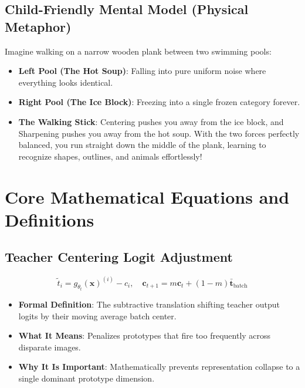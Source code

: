 \documentclass[11pt,a4paper]{article}
\theoremstyle{definition}
\begin{document}
\subsection{Child-Friendly Mental Model (Physical Metaphor)}
Imagine walking on a narrow wooden plank between two swimming pools:
\begin{itemize}
    \item \textbf{Left Pool (The Hot Soup)}: Falling into pure uniform noise where everything looks identical.
    \item \textbf{Right Pool (The Ice Block)}: Freezing into a single frozen category forever.
    \item \textbf{The Walking Stick}: Centering pushes you away from the ice block, and Sharpening pushes you away from the hot soup. With the two forces perfectly balanced, you run straight down the middle of the plank, learning to recognize shapes, outlines, and animals effortlessly!
\end{itemize}

\section{Core Mathematical Equations and Definitions}

\subsection{Teacher Centering Logit Adjustment}
{\boldmath
\begin{equation}
\tilde{t}_i = g_{\theta_t}(\mathbf{x})^{(i)} - c_i, \quad \mathbf{c}_{t+1} = m \mathbf{c}_t + (1 - m) \bar{\mathbf{t}}_{\text{batch}}
\end{equation}
}
\begin{itemize}
    \item \textbf{Formal Definition}: The subtractive translation shifting teacher output logits by their moving average batch center.
    \item \textbf{What It Means}: Penalizes prototypes that fire too frequently across disparate images.
    \item \textbf{Why It Is Important}: Mathematically prevents representation collapse to a single dominant prototype dimension.
\end{itemize}
\end{document}
